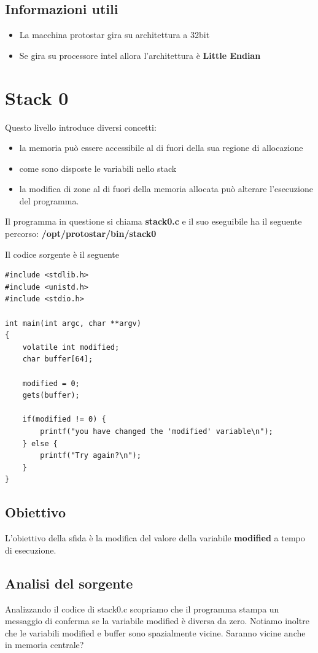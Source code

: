 \subsection{Informazioni utili}
\begin{itemize}
    \item La macchina protostar gira su architettura a 32bit
    \item Se gira su processore intel allora l'architettura è \textbf{Little Endian}
\end{itemize}

\section{Stack 0}
Questo livello introduce diversi concetti:
\begin{itemize}
    \item la memoria può essere accessibile al di fuori della sua regione di allocazione
    \item come sono disposte le variabili nello stack
    \item la modifica di zone al di fuori della memoria allocata può alterare l'esecuzione del programma.
\end{itemize}
Il programma in questione si chiama \textbf{stack0.c} e il suo eseguibile ha il seguente percorso: \textbf{/opt/protostar/bin/stack0}

Il codice sorgente è il seguente
\begin{lstlisting}[style=cstyle]
#include <stdlib.h>
#include <unistd.h>
#include <stdio.h>

int main(int argc, char **argv)
{
    volatile int modified;
    char buffer[64];

    modified = 0;
    gets(buffer);

    if(modified != 0) {
        printf("you have changed the 'modified' variable\n");
    } else {
        printf("Try again?\n");
    }
}
\end{lstlisting}

\subsection{Obiettivo}
L'obiettivo della sfida è la modifica del valore della variabile  \textbf{modified} a tempo di esecuzione.

\subsection{Analisi del sorgente}
Analizzando il codice di stack0.c scopriamo che il programma stampa un messaggio di conferma se la variabile modified è diversa da zero.
Notiamo inoltre che le variabili modified e buffer sono spazialmente vicine. Saranno vicine anche in memoria centrale?

